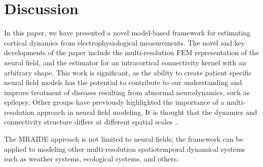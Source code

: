 \documentclass[journal]{IEEEtran}
\newcommand{\mike}[1]{\textcolor{red}{#1}}
\newcommand{\dean}[1]{\textcolor{green}{#1}}
\newcommand{\parham}[1]{\textcolor{blue}{#1}}
\newcommand{\ken}[1]{\textsf{\emph{\textbf{\textcolor{magenta}{#1}}}}}
\begin{document}
\section{Discussion}
In this paper, we have presented a novel model-based framework for estimating cortical dynamics from electrophysiological measurements. The novel and key developments of the paper include the multi-resolution FEM representation of the neural field, and the estimator for an intracortical connectivity kernel with an arbitrary shape. This work is significant, as the ability to create patient specific neural field models has the potential to contribute to our understanding and improve treatment of diseases resulting from abnormal neurodynamics, such as epilepsy. Other groups have previously highlighted the importance of a multi-resolution approach in neural field modeling. It is thought that the dynamics and connectivity structure differs at different spatial scales~\cite{Qubbaj2009,Breakspear2005}. %

The MRAIDE approach is not limited to neural fields; the framework can be applied to modeling other multi-resolution spatiotemporal dynamical systems such as weather systems, ecological systems, and others\cite{Wikle2002,Xu2005}. 

\end{document}
